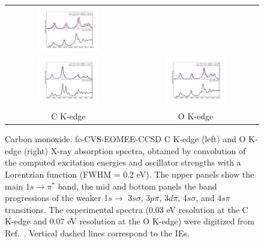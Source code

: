 \documentclass[journal=jctcce,manuscript=article]{achemso}
\begin{document}
\begin{figure}
\begin{tabular}{cc}
\includegraphics[width=0.50\textwidth]{Spectra/CO_O_2.pdf} \\\vspace{-0.5cm}
\hspace{-1cm}\includegraphics[width=0.50\textwidth]{Spectra/CO_C_2.pdf} &
\includegraphics[width=0.50\textwidth]{Spectra/CO_O_2_newshift.pdf}\\
%
\\C K-edge & O K-edge
\end{tabular}
\caption{Carbon monoxide. fc-CVS-EOMEE-CCSD
C K-edge (left) and O K-edge (right) X-ray absorption spectra, obtained by convolution of the computed excitation energies and oscillator strengths with a Lorentzian function (FWHM = 0.2 eV).
The upper panels show the main 1$s\to\pi^\ast$ band,
the mid and bottom panels the band progressions of the weaker 1$s\to$ 3$s\sigma$, 3$p\pi$, 3$d\pi$, 4$s\sigma$, and 4$s\pi$ transitions.
The experimental spectra (0.03 eV resolution at the C K-edge and 0.07 eV resolution at the O K-edge) were digitized from Ref.~.
Vertical dashed lines correspond to the IEs.
\label{fgr:co_both}
}
\end{figure}
\end{document}
